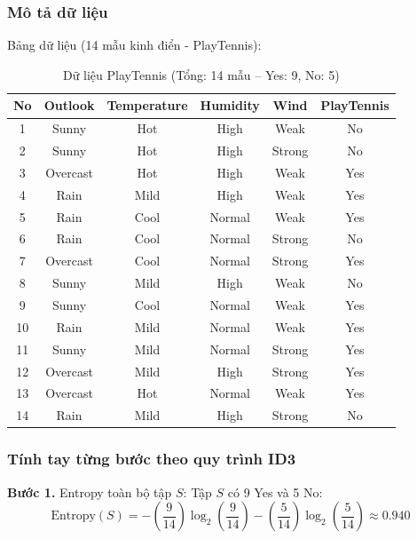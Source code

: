 \subsubsection*{Mô tả dữ liệu}
Bảng dữ liệu (14 mẫu kinh điển - PlayTennis):
\begin{table}[H]
    \centering
    \begin{tabular}{|c|c|c|c|c|c|}
        \hline
        \textbf{No} & \textbf{Outlook} & \textbf{Temperature} & \textbf{Humidity} & \textbf{Wind} & \textbf{PlayTennis} \\
        \hline
        1 & Sunny & Hot & High & Weak & No \\ \hline
        2 & Sunny & Hot & High & Strong & No \\ \hline
        3 & Overcast & Hot & High & Weak & Yes \\ \hline
        4 & Rain & Mild & High & Weak & Yes \\ \hline
        5 & Rain & Cool & Normal & Weak & Yes \\ \hline
        6 & Rain & Cool & Normal & Strong & No \\ \hline
        7 & Overcast & Cool & Normal & Strong & Yes \\ \hline
        8 & Sunny & Mild & High & Weak & No \\ \hline
        9 & Sunny & Cool & Normal & Weak & Yes \\ \hline
        10 & Rain & Mild & Normal & Weak & Yes \\ \hline
        11 & Sunny & Mild & Normal & Strong & Yes \\ \hline
        12 & Overcast & Mild & High & Strong & Yes \\ \hline
        13 & Overcast & Hot & Normal & Weak & Yes \\ \hline
        14 & Rain & Mild & High & Strong & No \\ \hline
    \end{tabular}
    \caption{Dữ liệu PlayTennis (Tổng: 14 mẫu -- Yes: 9, No: 5)}
\end{table}

\subsubsection*{Tính tay từng bước theo quy trình ID3}
\textbf{Bước 1.} Entropy toàn bộ tập $S$: Tập $S$ có 9 Yes và 5 No:
$$\text{Entropy}(S) = -\left(\frac{9}{14}\right)\log_2\left(\frac{9}{14}\right) - \left(\frac{5}{14}\right)\log_2\left(\frac{5}{14}\right) \approx 0.940$$

